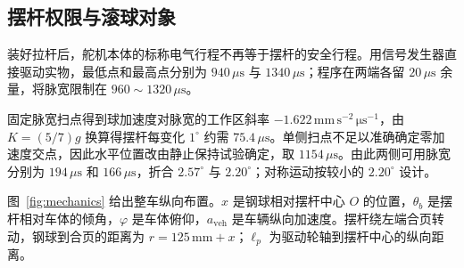 \documentclass[12pt,a4paper]{ctexart}
\newcommand{\unit}[1]{\ensuremath{\,\mathrm{#1}}}
\newcommand{\us}{\ensuremath{\,\mu\mathrm{s}}}
\begin{document}
\subsection{摆杆权限与滚球对象}

装好拉杆后，舵机本体的标称电气行程不再等于摆杆的安全行程。用信号发生器直接驱动实物，最低点和最高点分别为 $940\us$ 与 $1340\us$；程序在两端各留 $20\us$ 余量，将脉宽限制在 $960\sim1320\us$。

固定脉宽扫点得到球加速度对脉宽的工作区斜率 $-1.622\,\mathrm{mm\,s^{-2}\,\mu s^{-1}}$，由 $K=(5/7)g$ 换算得摆杆每变化 $1^\circ$ 约需 $75.4\us$。单侧扫点不足以准确确定零加速度交点，因此水平位置改由静止保持试验确定，取 $1154\us$。由此两侧可用脉宽分别为 $194\us$ 和 $166\us$，折合 $2.57^\circ$ 与 $2.20^\circ$；对称运动按较小的 $2.20^\circ$ 设计。

图~\ref{fig:mechanics} 给出整车纵向布置。$x$ 是钢球相对摆杆中心 $O$ 的位置，$\theta_b$ 是摆杆相对车体的倾角，$\varphi$ 是车体俯仰，$a_{\mathrm{veh}}$ 是车辆纵向加速度。摆杆绕左端合页转动，钢球到合页的距离为 $r=125\unit{mm}+x$；$\ell_p$ 为驱动轮轴到摆杆中心的纵向距离。
\end{document}
